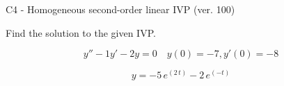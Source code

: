 \begin{exercise}
  \begin{exerciseTitle}C4 - Homogeneous second-order linear IVP (ver. 100)\end{exerciseTitle}
  \begin{exerciseStatement}
    
Find the solution to the given IVP.

    
\[y''-1y'-2y = 0 \hspace{1em} y(0) = -7 , y'(0) = -8\]

  \end{exerciseStatement}
  \begin{exerciseAnswer}
    
\[y= -5 \, e^{\left(2 \, t\right)} - 2 \, e^{\left(-t\right)}\]

  \end{exerciseAnswer}
\end{exercise}